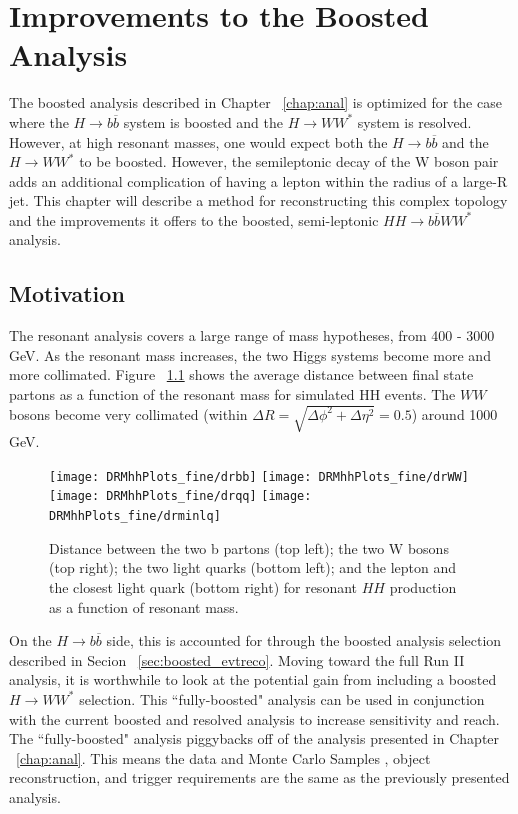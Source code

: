 \chapter{Improvements to the Boosted Analysis}
\label{chap:fully}
The boosted analysis described in Chapter ~\ref{chap:anal} is optimized for the case where the ${H\rightarrow b\overline{b}}$ system is boosted and the ${H\rightarrow WW^{*}}$ system is resolved. However, at high resonant masses, one would expect both the ${H\rightarrow b\overline{b}}$ and the ${H\rightarrow WW^{*}}$ to be boosted. However, the semileptonic decay of the W boson pair adds an additional complication of having a lepton within the radius of a large-R jet. This chapter will describe a method for reconstructing this complex topology and the improvements it offers to the boosted, semi-leptonic ${HH\rightarrow b\overline{b}WW^{*}}$ analysis.
\section{Motivation}
The resonant analysis covers a large range of mass hypotheses, from 400 - 3000 GeV. As the resonant mass increases, the two Higgs systems become more and more collimated. Figure ~\ref{fig:dr} shows the average distance between final state partons as a function of the resonant mass for simulated HH events. The $WW$ bosons become very collimated (within ${\Delta{R} = \sqrt{\Delta{\phi}^{2}+\Delta{\eta}^{2}} = 0.5}$) around 1000 GeV. \newline
\begin{figure}[h!]
\begin{center}
\texttt{[image: DRMhhPlots\_fine/drbb]}
\texttt{[image: DRMhhPlots\_fine/drWW]}
\\
\texttt{[image: DRMhhPlots\_fine/drqq]}
\texttt{[image: DRMhhPlots\_fine/drminlq]}

\caption[Distance between parton objects]{Distance between the two b partons (top left); the two W bosons (top right); the two light quarks (bottom left); and the lepton and the closest light quark (bottom right) for resonant $HH$ production as a function of resonant mass.}
\label{fig:dr}
\end{center}
\end{figure}
\indent On the ${H\rightarrow b\overline{b}}$ side, this is accounted for through the boosted analysis selection described in Secion ~\ref{sec:boosted_evtreco}. Moving toward the full Run II analysis, it is worthwhile to look at the potential gain from including a boosted ${H\rightarrow WW^{*}}$ selection. This ``fully-boosted" analysis can be used in conjunction with the current boosted and resolved analysis to increase sensitivity and reach.\newline
\indent The ``fully-boosted" analysis piggybacks off of the analysis presented in Chapter ~\ref{chap:anal}. This means the data and Monte Carlo Samples , object reconstruction, and trigger requirements are the same as the previously presented analysis. \newline
